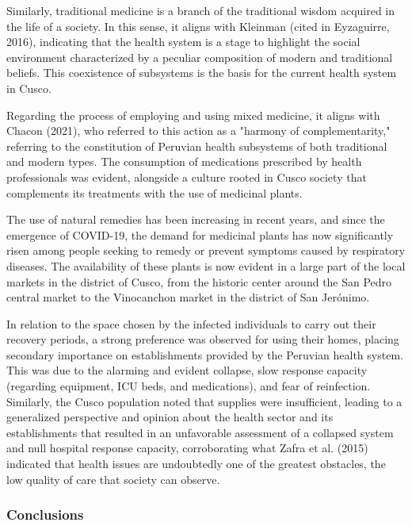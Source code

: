 \documentclass{article}
\begin{document}
Similarly, traditional medicine is a branch of the traditional wisdom acquired in the life of a society. In this sense, it aligns with Kleinman (cited in Eyzaguirre, 2016), indicating that the health system is a stage to highlight the social environment characterized by a peculiar composition of modern and traditional beliefs. This coexistence of subsystems is the basis for the current health system in Cusco.

Regarding the process of employing and using mixed medicine, it aligns with Chacon (2021), who referred to this action as a "harmony of complementarity," referring to the constitution of Peruvian health subsystems of both traditional and modern types. The consumption of medications prescribed by health professionals was evident, alongside a culture rooted in Cusco society that complements its treatments with the use of medicinal plants.

The use of natural remedies has been increasing in recent years, and since the emergence of COVID-19, the demand for medicinal plants has now significantly risen among people seeking to remedy or prevent symptoms caused by respiratory diseases. The availability of these plants is now evident in a large part of the local markets in the district of Cusco, from the historic center around the San Pedro central market to the Vinocanchon market in the district of San Jerónimo.

In relation to the space chosen by the infected individuals to carry out their recovery periods, a strong preference was observed for using their homes, placing secondary importance on establishments provided by the Peruvian health system. This was due to the alarming and evident collapse, slow response capacity (regarding equipment, ICU beds, and medications), and fear of reinfection. Similarly, the Cusco population noted that supplies were insufficient, leading to a generalized perspective and opinion about the health sector and its establishments that resulted in an unfavorable assessment of a collapsed system and null hospital response capacity, corroborating what Zafra et al. (2015) indicated that health issues are undoubtedly one of the greatest obstacles, the low quality of care that society can observe.

\subsubsection{\textbf{Conclusions}}
\end{document}
